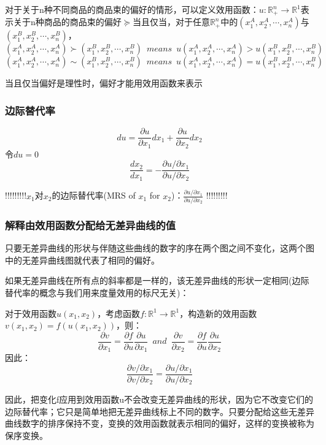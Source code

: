 \documentclass{article}
\begin{document}
对于关于n种不同商品的商品束的偏好的情形，可以定义效用函数：$ u:\mathbb{R}^n_+\rightarrow \mathbb{R}^1$表示关于n种商品的商品束的偏好$ \succeq $当且仅当，对于任意$ \mathbb{R}^n_+ $中的$ (x_1^A,x_2^A,\cdots,x_n^A) $与$ (x_1^B,x_2^B,\cdots,x_n^B) $，
\[
(x_1^A,x_2^A,\cdots,x_n^A) \succ (x_1^B,x_2^B,\cdots,x_n^B)\enspace means\enspace u(x_1^A,x_2^A,\cdots,x_n^A) >u(x_1^B,x_2^B,\cdots,x_n^B)
\]
\[
(x_1^A,x_2^A,\cdots,x_n^A) \sim (x_1^B,x_2^B,\cdots,x_n^B)\enspace means\enspace u(x_1^A,x_2^A,\cdots,x_n^A) = u(x_1^B,x_2^B,\cdots,x_n^B)
\]

当且仅当偏好是理性时，偏好才能用效用函数来表示

\subsubsection{边际替代率}
\[
du=\frac{\partial u}{\partial x_1}dx_1+\frac{\partial u}{\partial x_2}dx_2
\]
令$ du=0 $
\[
\frac{dx_2}{dx_1}=-\frac{\partial u/\partial x_1}{\partial u/\partial x_2}
\]

!!!!!!!!!$ x_1 $对$ x_2 $的边际替代率(MRS of $ x_1 $ for $ x_2 $)：$ \frac{\partial u/\partial x_1}{\partial u/\partial x_2} $ !!!!!!!!!



\subsubsection{解释由效用函数分配给无差异曲线的值}
只要无差异曲线的形状与伴随这些曲线的数字的序在两个图之间不变化，这两个图中的无差异曲线图就代表了相同的偏好。

\hspace*{\fill}

如果无差异曲线在所有点的斜率都是一样的，该无差异曲线的形状一定相同(边际替代率的概念与我们用来度量效用的标尺无关)：

对于效用函数$ u(x_1,x_2) $，考虑函数$ f:\mathbb{R}^1\rightarrow\mathbb{R}^1 $，构造新的效用函数$ v(x_1,x_2)=f(u(x_1,x_2)) $，则：
\[
\frac{\partial v}{\partial x_1}=\frac{\partial f}{\partial u}\frac{\partial u}{\partial x_1}\enspace and\enspace \frac{\partial v}{\partial x_2}=\frac{\partial f}{\partial u}\frac{\partial u}{\partial x_2}
\]
因此：
\[
\frac{\partial v/\partial x_1}{\partial v/\partial x_2}=\frac{\partial u/\partial x_1}{\partial u/\partial x_2}
\]

因此，把变化f应用到效用函数u不会改变无差异曲线的形状，因为它不改变它们的边际替代率；它只是简单地把无差异曲线标上不同的数字。只要分配给这些无差异曲线数字的排序保持不变，变换的效用函数就表示相同的偏好，这样的变换被称为保序变换。
\end{document}
